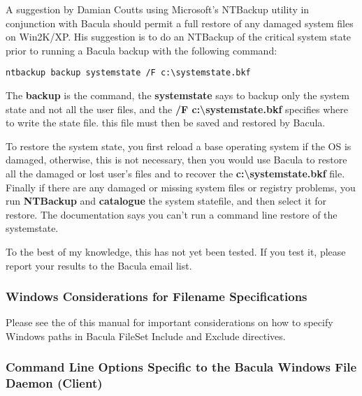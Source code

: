 A suggestion by Damian Coutts using Microsoft's NTBackup utility in
conjunction with Bacula should permit a full restore of any damaged system
files on Win2K/XP. His suggestion is to do an NTBackup of the critical system
state prior to running a Bacula backup with the following command: 

\footnotesize
\begin{verbatim}
ntbackup backup systemstate /F c:\systemstate.bkf
\end{verbatim}
\normalsize

The {\bf backup} is the command, the {\bf systemstate} says to backup only the
system state and not all the user files, and the {\bf /F
c:\textbackslash{}systemstate.bkf} specifies where to write the state file.
this file must then be saved and restored by Bacula. 

To restore the system state, you first reload a base operating system if the
OS is damaged, otherwise, this is not necessary, then you would use Bacula to
restore all the damaged or lost user's files and to recover the {\bf
c:\textbackslash{}systemstate.bkf} file. Finally if there are any damaged or
missing system files or registry problems, you run {\bf NTBackup} and {\bf
catalogue} the system statefile, and then select it for restore. The
documentation says you can't run a command line restore of the systemstate. 

To the best of my knowledge, this has not yet been tested. If you test it,
please report your results to the Bacula email list. 

\subsubsection*{Windows Considerations for Filename Specifications}

Please see the 
 of this manual
for important considerations on how to specify Windows paths in Bacula FileSet
Include and Exclude directives. 

\subsubsection*{Command Line Options Specific to the Bacula Windows File
Daemon (Client)}

